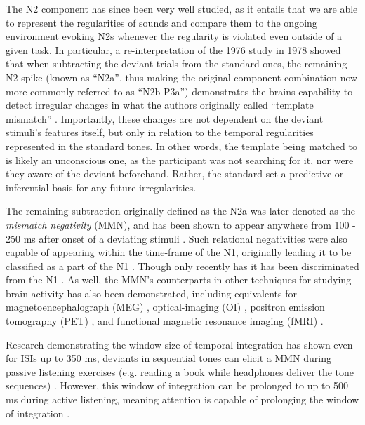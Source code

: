 \documentclass[a4paper,10pt,final]{ThesisStyle}
\begin{document}
The N2 component has since been very well studied, as it entails that we are able to represent the regularities of sounds and compare them to the ongoing environment evoking N2s whenever the regularity is violated even outside of a given task.  In particular, a re-interpretation of the 1976 study in 1978 showed that when subtracting the deviant trials from the standard ones, the remaining N2 spike (known as ``N2a'', thus making the original component combination now more commonly referred to as ``N2b-P3a'') demonstrates the brains capability to detect irregular changes in what the authors originally called ``template mismatch'' \cite{Naatanen1978}.  Importantly, these changes are not dependent on the deviant stimuli's features itself, but only in relation to the temporal regularities represented in the standard tones.  In other words, the template being matched to is likely an unconscious one, as the participant was not searching for it, nor were they aware of the deviant beforehand.  Rather, the standard set a predictive or inferential basis for any future irregularities.  

The remaining subtraction originally defined as the N2a was later denoted as the \textit{mismatch negativity} (MMN), and has been shown to appear anywhere from 100 - 250 ms after onset of a deviating stimuli \cite{Naatanen1978,Naatanen1987,Naatanen2007,Campbell2007,Garrido2009,Naatanen2011}.  Such relational negativities were also capable of appearing within the time-frame of the N1, originally leading it to be classified as a part of the N1 \cite{Naatanen1987}.  Though only recently has it has been discriminated from the N1 \cite{Campbell2007}.  As well, the MMN's counterparts in other techniques for studying brain activity has also been demonstrated, including equivalents for magnetoencephalograph (MEG) \cite{Hari1984}, optical-imaging (OI) \cite{Rinne1999}, positron emission tomography (PET) \cite{Tervaniemi2000}, and functional magnetic resonance imaging (fMRI) \cite{Celsis1999}.  

Research demonstrating the window size of temporal integration has shown even for ISIs up to 350 ms, deviants in sequential tones can elicit a MMN during passive listening exercises (e.g. reading a book while headphones deliver the tone sequences) \cite{Tervaniemi1994,Tervaniemi1997}.  However, this window of integration can be prolonged to up to 500 ms during active listening, meaning attention is capable of prolonging the window of integration \cite{Kanoh2001}.  
\end{document}
